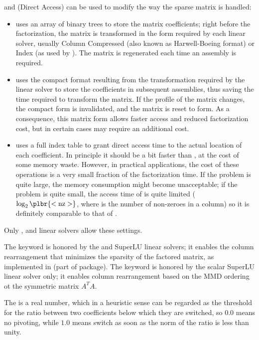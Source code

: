 and  (Direct Access) can be used to modify the way
the sparse matrix is handled:
\begin{itemize}
\item {} uses an array of binary trees to store the matrix
coefficients; right before the factorization, the matrix is transformed
in the form required by each linear solver, usually Column Compressed
(also known as Harwell-Boeing format) or Index (as used by ).
The matrix is regenerated each time an assembly is required.
\item {} uses the compact format resulting from the transformation
required by the linear solver to store the coefficients in subsequent assemblies,
thus saving the time required to transform the matrix.
If the profile of the matrix changes, the compact form is invalidated,
and the matrix is reset to  form.  As a consequence, this matrix
form allows faster access and reduced factorization cost, but in certain
cases may require an additional cost.
\item {} uses a full index table to grant direct access time to
the actual location of each coefficient.
In principle it should be a bit faster than , at the cost
of some memory waste.
However, in practical applications, the cost of these operations
is a very small fraction of the factorization time.
If the problem is quite large, the memory consumption might
become unacceptable; if the problem is quite small, the access time
of  is quite limited ($\log_2\plbr{\mathrm{<nz>}}$, where
 is the number of non-zeroes in a column) so it is definitely
comparable to that of .
\end{itemize}
Only ,  and  linear solvers allow these
settings.

\noindent
The keyword  is honored by the  and SuperLU linear solvers;
it enables the column rearrangement that minimizes the sparsity
of the factored matrix, as implemented in 
(part of  package). The keyword  is honored by 
the scalar SuperLU linear solver only; it enables column rearrangement
based on the MMD ordering ot the symmetric matrix $A^T A$.


\noindent
The  is a real number, which in a heuristic sense 
can be regarded as the threshold for the ratio between two coefficients 
below which they are switched, so $ 0.0 $ means no pivoting, 
while $ 1.0 $ means switch as soon as the norm of the ratio 
is less than unity.

